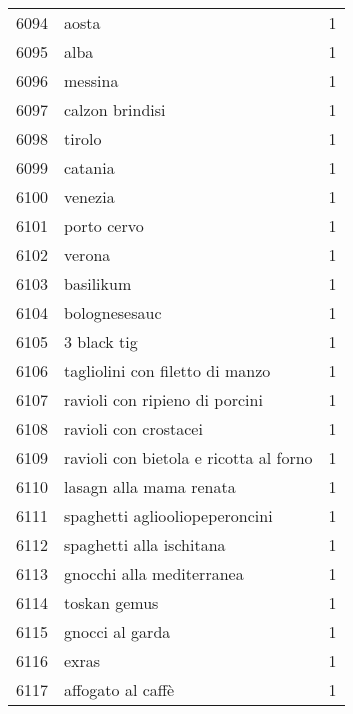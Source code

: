 \begin{tabular}{llr}
6094 &                                              aosta &      1 \\
6095 &                                               alba &      1 \\
6096 &                                            messina &      1 \\
6097 &                                    calzon brindisi &      1 \\
6098 &                                             tirolo &      1 \\
6099 &                                            catania &      1 \\
6100 &                                            venezia &      1 \\
6101 &                                        porto cervo &      1 \\
6102 &                                             verona &      1 \\
6103 &                                          basilikum &      1 \\
6104 &                                      bolognesesauc &      1 \\
6105 &                                        3 black tig &      1 \\
6106 &                    tagliolini con filetto di manzo &      1 \\
6107 &                     ravioli con ripieno di porcini &      1 \\
6108 &                              ravioli con crostacei &      1 \\
6109 &             ravioli con bietola e ricotta al forno &      1 \\
6110 &                            lasagn alla mama renata &      1 \\
6111 &                     spaghetti agliooliopeperoncini &      1 \\
6112 &                           spaghetti alla ischitana &      1 \\
6113 &                          gnocchi alla mediterranea &      1 \\
6114 &                                       toskan gemus &      1 \\
6115 &                                    gnocci al garda &      1 \\
6116 &                                              exras &      1 \\
6117 &                                  affogato al caffè &      1 \\

\end{tabular}
